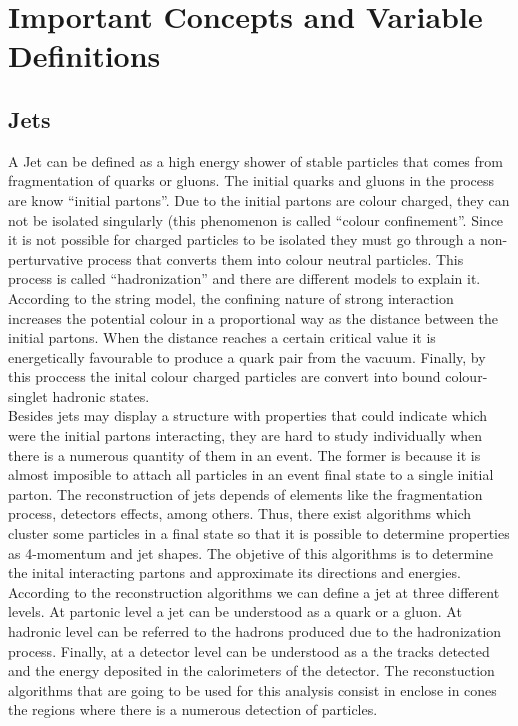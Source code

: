  \chapter{Important Concepts and Variable Definitions}
 
 \section{Jets}
 A Jet can be defined as a high energy shower of stable particles that comes from fragmentation of quarks or gluons. The initial quarks and gluons in the process are know ``initial partons''.
 Due to the initial partons are colour charged, they can not be isolated singularly (this phenomenon is called ``colour confinement''. Since it is not possible for charged particles to be isolated 
 they must go through a non-perturvative process that converts them into colour neutral particles. This process is called ``hadronization'' and there are different models to explain it. According to 
 the string model, the confining nature of strong interaction increases the potential colour in a proportional way as the distance between the initial partons. When the distance reaches a certain 
 critical value it is energetically favourable to produce a quark pair from the vacuum. Finally, by this proccess the inital colour charged particles are convert into bound colour-singlet hadronic 
 states. \\
 
 Besides jets may display a structure with properties that could indicate which were the initial partons interacting, they are hard to study individually when there is a numerous quantity of them
 in an event. The former is because it is almost imposible to attach all particles in an event final state to a single initial parton. The reconstruction of jets depends of elements like the 
 fragmentation process, detectors effects, among others. Thus, there exist algorithms which cluster some particles in a final state so that it is possible to determine properties as 4-momentum 
 and jet shapes. The objetive of this algorithms is to determine the inital interacting partons and approximate its directions and energies. \\
 
 According to the reconstruction algorithms we can define a jet at three different levels. At partonic level a jet can be understood as a quark or a gluon. At hadronic level can be referred to the
 hadrons produced due to the hadronization process. Finally, at a detector level can be understood as a the tracks detected and the energy deposited in the calorimeters of the detector. The 
 reconstuction algorithms that are going to be used for this analysis consist in enclose in cones the regions where there is a numerous detection of particles. 
 
